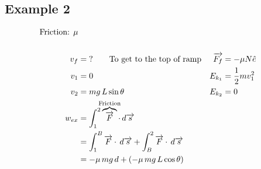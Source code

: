 \documentclass[12pt]{article}
\begin{document}
\subsection{Example 2}
\begin{align*}
	\text{Friction: } \mu                                                                                                                                                        \\
	\phantom{=}                                                                                                                                                                  \\
	v_f    & = \text{?} \qquad \text{To get to the top of ramp}                                                                    & \overrightarrow{F_f} & = - \mu N \hat{e}    \\
	v_1    & = 0                                                                                                                   & E_{k_1}              & = \frac{1}{2} mv_1^2 \\
	v_2    & = mg \, L\sin{\theta}                                                                                                 & E_{k_2}              & = 0                  \\
	w_{ex} & = \int_1^2 \overbrace{\overrightarrow{F}}^\text{\hidewidth Friction\hidewidth} \cdot \, d\overrightarrow{s}                                                         \\
	       & = \int_1^B \overrightarrow{F} \cdot \, d\overrightarrow{s} + \int_B^2 \overrightarrow{F} \cdot \, d\overrightarrow{s}                                               \\
	       & = -\mu \, mg \, d + (-\mu \, mg \, L \cos{\theta})                                                                                                                  \\
\end{align*}
\end{document}
